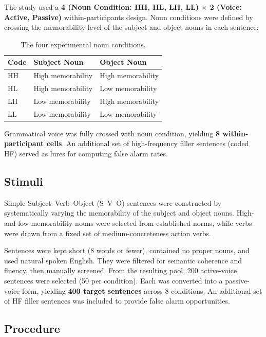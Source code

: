 \documentclass[12pt, a4paper]{article}
\begin{document}
The study used a \textbf{4 (Noun Condition: HH, HL, LH, LL) $\times$ 2 (Voice: Active, Passive)} within-participants design. Noun conditions were defined by crossing the memorability level of the subject and object nouns in each sentence:

\begin{table}[htbp]
  \centering
  \small
  \begin{tabular}{lll}
    \toprule
    \textbf{Code} & \textbf{Subject Noun} & \textbf{Object Noun} \\
    \midrule
    HH & High memorability & High memorability \\
    HL & High memorability & Low memorability \\
    LH & Low memorability & High memorability \\
    LL & Low memorability & Low memorability \\
    \bottomrule
  \end{tabular}
  \caption{The four experimental noun conditions.}
  \label{tab:conditions}
\end{table}

Grammatical voice was fully crossed with noun condition, yielding \textbf{8 within-participant cells}. An additional set of high-frequency filler sentences (coded HF) served as lures for computing false alarm rates.

\subsection{Stimuli}

Simple Subject--Verb--Object (S--V--O) sentences were constructed by systematically varying the memorability of the subject and object nouns. High- and low-memorability nouns were selected from established norms, while verbs were drawn from a fixed set of medium-concreteness action verbs. 

Sentences were kept short (8 words or fewer), contained no proper nouns, and used natural spoken English. They were filtered for semantic coherence and fluency, then manually screened. From the resulting pool, 200 active-voice sentences were selected (50 per condition). Each was converted into a passive-voice form, yielding \textbf{400 target sentences} across 8 conditions. An additional set of HF filler sentences was included to provide false alarm opportunities.

\subsection{Procedure}
\end{document}

